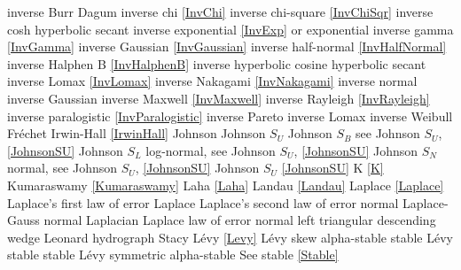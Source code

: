 inverse Burr					\dotfill	Dagum 								\ncite	%
inverse chi  					\dotfill	\eqref{InvChi}						\ncite	%
inverse chi-square 				\dotfill	\eqref{InvChiSqr}					\ncite	%
inverse cosh					\dotfill	hyperbolic secant					\ncite
inverse exponential 			\dotfill	\eqref{InvExp} or exponential		\ncite	%
inverse gamma 					\dotfill	\eqref{InvGamma}					\ncite	%
inverse Gaussian				\dotfill	\eqref{InvGaussian}					\ncite	%
inverse half-normal				\dotfill	\eqref{InvHalfNormal}				\ncite
inverse Halphen B				\dotfill	\eqref{InvHalphenB}					\ncite	
inverse hyperbolic cosine		\dotfill	hyperbolic secant 					\ncite	%
inverse Lomax					\dotfill	\eqref{InvLomax}					\ncite	%
inverse Nakagami				\dotfill	\eqref{InvNakagami}					
inverse normal					\dotfill	inverse Gaussian					\ncite	%
inverse Maxwell					\dotfill	\eqref{InvMaxwell}					
inverse Rayleigh  				\dotfill	\eqref{InvRayleigh}					\ncite	%
inverse paralogistic			\dotfill	\eqref{InvParalogistic} 			\ncite	%
inverse Pareto					\dotfill	inverse Lomax 						\ncite 	%
inverse Weibull 				\dotfill	Fr\'{e}chet  						\ncite	%
Irwin-Hall						\dotfill	\eqref{IrwinHall}					\ncite
%
Johnson							\dotfill	Johnson $S_U$						\ncite
Johnson $S_B$					\dotfill	see Johnson $S_U$, \eqref{JohnsonSU}\ncite
Johnson $S_L$					\dotfill	log-normal, see Johnson $S_U$, \eqref{JohnsonSU}		\ncite
Johnson $S_N$					\dotfill	normal, see Johnson $S_U$, \eqref{JohnsonSU}			\ncite
Johnson $S_U$					\dotfill	\eqref{JohnsonSU}					\ncite
%
K								\dotfill	\eqref{K}							\ncite	%
Kumaraswamy						\dotfill	\eqref{Kumaraswamy} 				\ncite	%
%
Laha							\dotfill	\eqref{Laha}						\ncite
Landau							\dotfill	\eqref{Landau}						\ncite
Laplace							\dotfill	\eqref{Laplace} 					\ncite	%
Laplace's first law of error	\dotfill	Laplace 							\ncite	%
Laplace's second law of error  	\dotfill	normal 								\ncite	%
Laplace-Gauss					\dotfill	normal 								\ncite	%
Laplacian  						\dotfill	Laplace								\ncite 	%
law of error					\dotfill	normal 								\ncite	%
left triangular					\dotfill	descending wedge					\ncite	%
Leonard hydrograph				\dotfill	Stacy 								\ncite	%
L\'{e}vy 						\dotfill	\eqref{Levy}						\ncite	%
L\'evy skew alpha-stable		\dotfill	stable								\ncite
L\'{e}vy stable					\dotfill	stable								\ncite
L\'evy symmetric alpha-stable	\dotfill   	See stable \eqref{Stable}			\ncite
